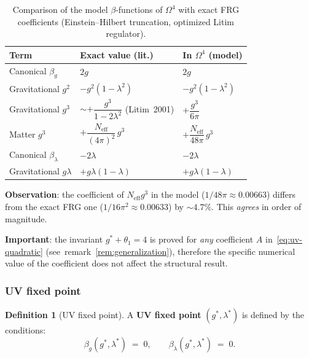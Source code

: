 \documentclass[11pt,a4paper]{article}
\newcommand{\Om}{\ensuremath{\Omega^4}}
\theoremstyle{definition}
\newtheorem{definition}[theorem]{Definition}
\begin{document}
\begin{table}[ht]
\centering
\caption{Comparison of the model \texorpdfstring{$\beta$}{}-functions of \texorpdfstring{$\Om$}{}
with exact FRG coefficients (Einstein--Hilbert truncation,
optimized Litim regulator).}
\label{tab:frg-coeff-comparison}
\begin{tabular}{p{3cm}p{4cm}p{4cm}}
\toprule
Term & Exact value (lit.) & In $\Om$ (model) \\
\midrule
Canonical $\beta_g$ & $2g$ & $2g$ \\
Gravitational $g^2$ & $-g^2(1-\lambda^2)$ &
    $-g^2(1-\lambda^2)$ \\
Gravitational $g^3$ &
    $\sim +\dfrac{g^3}{1-2\lambda^2}$ (Litim~2001) &
    $+\dfrac{g^3}{6\pi}$ \\[0.5em]
Matter $g^3$ &
    $+\dfrac{N_{\text{eff}}}{(4\pi)^2}\,g^3$ &
    $+\dfrac{N_{\text{eff}}}{48\pi}\,g^3$ \\[0.5em]
Canonical $\beta_\lambda$ & $-2\lambda$ & $-2\lambda$ \\
Gravitational $g\lambda$ & $+g\lambda(1-\lambda)$ &
    $+g\lambda(1-\lambda)$ \\
\bottomrule
\end{tabular}
\end{table}

\medskip\noindent
\textbf{Observation}: the coefficient of $N_{\text{eff}} g^3$
in the model ($1/48\pi \approx 0.00663$) differs from
the exact FRG one ($1/16\pi^2 \approx 0.00633$) by $\sim 4.7\%$.
This \emph{agrees} in order of magnitude.

\medskip\noindent
\textbf{Important}: the invariant $g^* + \theta_1 = 4$ is proved for
\emph{any} coefficient $A$ in~\eqref{eq:uv-quadratic}
(see~remark~\ref{rem:generalization}), therefore
the specific numerical value of the coefficient does not affect
the structural result.

\subsubsection{UV fixed point}

\begin{definition}[UV fixed point]
\label{def:uv-fixed-point}
A \textbf{UV fixed point} $(g^*, \lambda^*)$ is defined by
the conditions:
\begin{equation}
    \beta_g(g^*, \lambda^*) \;=\; 0, \qquad
    \beta_\lambda(g^*, \lambda^*) \;=\; 0.
    \label{eq:fixed-point-conditions}
\end{equation}
\end{definition}
\end{document}
